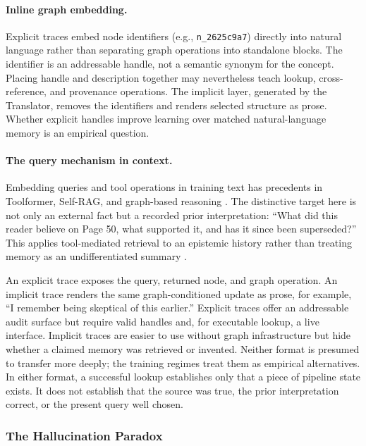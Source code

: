 \vspace{1em}
\paragraph{Inline graph embedding.} Explicit traces embed node identifiers
(e.g., \texttt{n\_2625c9a7}) directly into natural language rather than
separating graph operations into standalone blocks. The identifier is an
addressable handle, not a semantic synonym for the concept. Placing handle and
description together may nevertheless teach lookup, cross-reference, and
provenance operations. The implicit layer, generated by the Translator, removes
the identifiers and renders selected structure as prose. Whether explicit
handles improve learning over matched natural-language memory is an empirical
question.

\paragraph{The query mechanism in context.} Embedding queries and tool
operations in training text has precedents in Toolformer, Self-RAG, and
graph-based reasoning \cite{schick2023toolformer,asai2023selfrag,yao2024graphcot}.
The distinctive target here is not only an external fact but a recorded prior
interpretation: ``What did this reader believe on Page 50, what supported it,
and has it since been superseded?'' This applies tool-mediated retrieval to an
epistemic history rather than treating memory as an undifferentiated summary
\cite{packer2023memgpt}.

An explicit trace exposes the query, returned node, and graph operation. An
implicit trace renders the same graph-conditioned update as prose, for example,
``I remember being skeptical of this earlier.'' Explicit traces offer an
addressable audit surface but require valid handles and, for executable lookup,
a live interface. Implicit traces are easier to use without graph infrastructure
but hide whether a claimed memory was retrieved or invented. Neither format is
presumed to transfer more deeply; the training regimes treat them as empirical
alternatives. In either format, a successful lookup establishes only that a
piece of pipeline state exists. It does not establish that the source was true,
the prior interpretation correct, or the present query well chosen.

\subsubsection{The Hallucination Paradox}\label{sec:hallucination}

